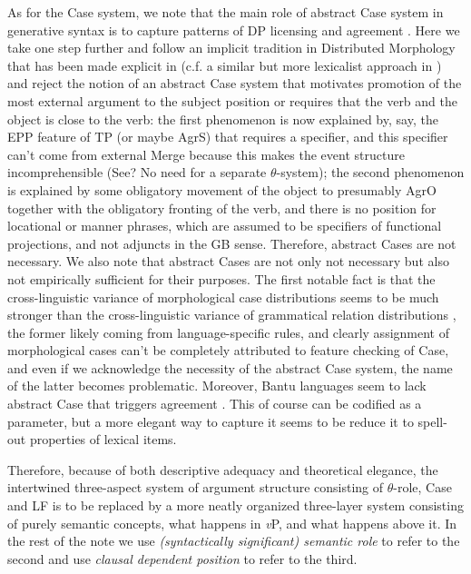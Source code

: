 \documentclass[UTF8, a4paper, oneside, scheme=plain, 12pt]{ctexbook}
\newcommand*{\term}[1]{\emph{#1}}
\newcommand{\vP}{\textit{v}P}
\begin{document}
{As for the Case system,
we note that the main role of abstract Case system in generative syntax 
is to capture patterns of DP licensing and agreement \citep{polinsky2014case}.
Here we take one step further and follow an implicit tradition in Distributed Morphology 
that has been made explicit in \citet{schafer2020case}
(c.f. a similar but more lexicalist approach in \citet{sigurdhsson2012minimalist})
and reject the notion of an abstract Case system that motivates 
promotion of the most external argument to the subject position 
or requires that the verb and the object is close to the verb:
the first phenomenon is now explained by, say, the EPP feature of TP (or maybe AgrS) that requires a specifier, 
and this specifier can't come from external Merge 
because this makes the event structure incomprehensible
(See? No need for a separate $\theta$-system);
the second phenomenon is explained by some obligatory movement of the object to presumably AgrO 
together with the obligatory fronting of the verb, 
and there is no position for locational or manner phrases, 
which are assumed to be specifiers of functional projections,
and not adjuncts in the GB sense.
Therefore, abstract Cases are not necessary.
We also note that abstract Cases are not only not necessary but also not empirically sufficient for their purposes. 
The first notable fact is that the cross-linguistic variance of morphological case distributions
seems to be much stronger than the cross-linguistic variance of grammatical relation distributions
\citep{maling2001dative},
the former likely coming from language-specific rules,
and clearly assignment of morphological cases can't be completely attributed to feature checking of Case,
and even if we acknowledge the necessity of the abstract Case system,
the name of the latter becomes problematic. 
Moreover, Bantu languages seem to lack abstract Case that triggers agreement 
\citep{diercks2012parameterizing}.
This of course can be codified as a parameter, 
but a more elegant way to capture it seems to be reduce it 
to spell-out properties of lexical items.

Therefore, because of both descriptive adequacy and theoretical elegance,
the intertwined three-aspect system of argument structure consisting of $\theta$-role, Case and LF 
is to be replaced by a more neatly organized three-layer system 
consisting of purely semantic concepts, 
what happens in \vP, and what happens above it.
In the rest of the note we use \term{(syntactically significant) semantic role} to refer to the second
and use \term{clausal dependent position} to refer to the third.

}
\end{document}
